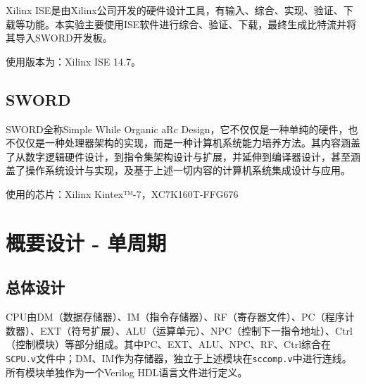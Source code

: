 \documentclass[UTF8,a4paper,autofakebold,15pt]{ctexart}
\begin{document}
	Xilinx ISE是由Xilinx公司开发的硬件设计工具，有输入、综合、实现、验证、下载等功能。本实验主要使用ISE软件进行综合、验证、下载，最终生成比特流并将其导入SWORD开发板。
	
	使用版本为：Xilinx ISE 14.7。

\subsection{SWORD}

	SWORD全称Simple While Organic aRc Design，它不仅仅是一种单纯的硬件，也不仅仅是一种处理器架构的实现，而是一种计算机系统能力培养方法。其内容涵盖了从数字逻辑硬件设计，到指令集架构设计与扩展，并延伸到编译器设计，甚至涵盖了操作系统设计与实现，及基于上述一切内容的计算机系统集成设计与应用。

	
	使用的芯片：Xilinx Kintex™-7，XC7K160T-FFG676

\newpage

\section{概要设计 - 单周期}

\subsection{总体设计}

CPU由DM（数据存储器）、IM（指令存储器）、RF（寄存器文件）、PC（程序计数器）、EXT（符号扩展）、ALU（运算单元）、NPC（控制下一指令地址）、Ctrl（控制模块）等部分组成。其中PC、EXT、ALU、NPC、RF、Ctrl综合在{\tt SCPU.v}文件中；DM、IM作为存储器，独立于上述模块在{\tt sccomp.v}中进行连线。所有模块单独作为一个Verilog HDL语言文件进行定义。
\end{document}
